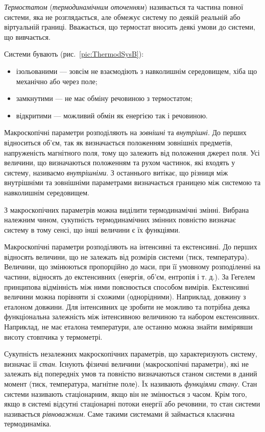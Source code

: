 \emph{Термостатом} (\emph{термодинамічним оточенням}) називається та частина повної системи, яка не розглядається, але обмежує систему по деякій реальній або віртуальній границі. Вважається, що термостат вносить деякі умови до системи, що вивчається.


Системи бувають (рис.~\ref{pic:ThermodSysB}):
\begin{itemize}
    \item ізольованими --- зовсім не взаємодіють з навколишнім середовищем, хіба що механічно або через поле;
    \item замкнутими --- не має обміну речовиною з термостатом;
    \item відкритими ---  можливий обмін як енергією так і речовиною.
\end{itemize}


Макроскопічні параметри розподіляють на \emph{зовнішні} та \emph{внутрішні}. До перших відноситься об’єм, так як визначається положенням зовнішніх предметів, напруженість магнітного поля, тому що залежить від положення джерел поля. Усі величини, що визначаються положенням та рухом частинок, які входять у систему, називаємо \emph{внутрішніми}. З останнього витікає, що різниця між внутрішніми та зовнішніми параметрами визначається границею між системою та навколишнім середовищем.

З макроскопічних параметрів можна виділити термодинамічні змінні. Вибрана належним чином, сукупність термодинамічних змінних повністю визначає систему в тому сенсі, що інші величини є їх функціями.

Макроскопічні параметри розподіляють на інтенсивні та екстенсивні. До перших відносять величини, що не залежать від розмірів системи (тиск, температура). Величини, що змінюються пропорційно до маси, при її умовному розподіленні на частини, відносять до екстенсивних (енергія, об’єм, ентропія і т. д.). За Гегелем принципова відмінність між ними пояснюється способом вимірів. Екстенсивні величини можна порівняти зі схожими (однорідними). Наприклад, довжину з еталоном довжини. Для інтенсивних це зробити не можливо та потрібна деяка функціональна залежність між інтенсивною величиною та набором екстенсивних. Наприклад, не має еталона температури, але останню можна знайти вимірявши висоту стовпчика у термометрі.

Сукупність незалежних макроскопічних параметрів, що характеризують систему, визначає її \emph{стан}. Існують фізичні величини (макроскопічні параметри), які не залежать від попередніх умов та повністю визначаються станом системи в даний момент (тиск, температура, магнітне поле). Їх називають \emph{функціями стану}. Стан системи називають стаціонарним, якщо він не змінюється з часом. Крім того, якщо в системі відсутні стаціонарні потоки енергії або речовини, то стан системи називається \emph{рівноважним}. Саме такими системами й займається класична термодинаміка.





